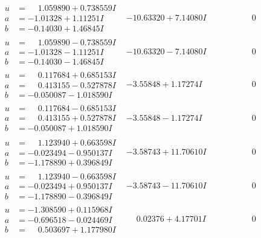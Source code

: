 \documentclass[1p]{elsarticle_modified}
\theoremstyle{definition}
\begin{document}
$$\begin{array}{c|c|c}
\begin{aligned}
u &= \phantom{-}1.059890 + 0.738559 I \\
a &= -1.01328 + 1.11251 I \\
b &= -0.14030 + 1.46845 I\end{aligned}
 & -10.63320 + 7.14080 I & \phantom{-0.000000 } 0 \\ \hline\begin{aligned}
u &= \phantom{-}1.059890 - 0.738559 I \\
a &= -1.01328 - 1.11251 I \\
b &= -0.14030 - 1.46845 I\end{aligned}
 & -10.63320 - 7.14080 I & \phantom{-0.000000 } 0 \\ \hline\begin{aligned}
u &= \phantom{-}0.117684 + 0.685153 I \\
a &= \phantom{-}0.413155 - 0.527878 I \\
b &= -0.050087 - 1.018590 I\end{aligned}
 & -3.55848 + 1.17274 I & \phantom{-0.000000 } 0 \\ \hline\begin{aligned}
u &= \phantom{-}0.117684 - 0.685153 I \\
a &= \phantom{-}0.413155 + 0.527878 I \\
b &= -0.050087 + 1.018590 I\end{aligned}
 & -3.55848 - 1.17274 I & \phantom{-0.000000 } 0 \\ \hline\begin{aligned}
u &= \phantom{-}1.123940 + 0.663598 I \\
a &= -0.023494 - 0.950137 I \\
b &= -1.178890 + 0.396849 I\end{aligned}
 & -3.58743 + 11.70610 I & \phantom{-0.000000 } 0 \\ \hline\begin{aligned}
u &= \phantom{-}1.123940 - 0.663598 I \\
a &= -0.023494 + 0.950137 I \\
b &= -1.178890 - 0.396849 I\end{aligned}
 & -3.58743 - 11.70610 I & \phantom{-0.000000 } 0 \\ \hline\begin{aligned}
u &= -1.308590 + 0.115968 I \\
a &= -0.696518 - 0.024469 I \\
b &= \phantom{-}0.503697 + 1.177980 I\end{aligned}
 & \phantom{-}0.02376 + 4.17701 I & \phantom{-0.000000 } 0 \\ \hline\begin{aligned}

\end{aligned}
\end{array}$$
\end{document}
